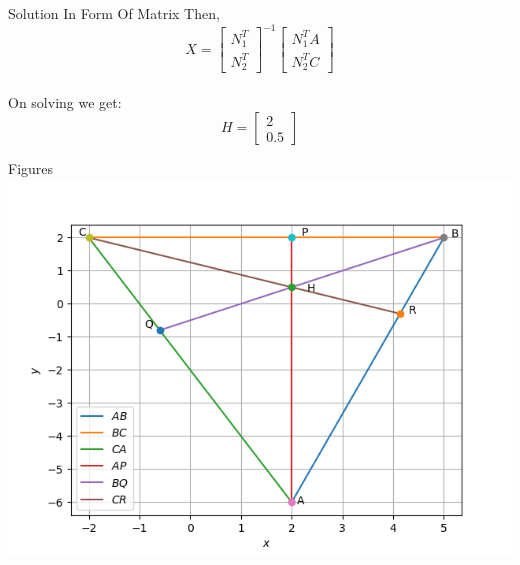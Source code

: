 \documentclass{beamer}
\begin{document}
\begin{frame}{Solution In Form Of Matrix}
Then,
\\
\[X = \begin{bmatrix}N_{1}^T \\ N_{2}^T \end{bmatrix}^{-1}\begin{bmatrix}N_{1}^TA \\ N_{2}^TC \end{bmatrix}\]
\\
On solving we get:
\[H = \begin{bmatrix}2 \\ 0.5 \end{bmatrix}\]
\end{frame}
\begin{frame}{Figures}
\includegraphics[scale = 0.6]{triangle.png}
\end{frame}
\end{document}
